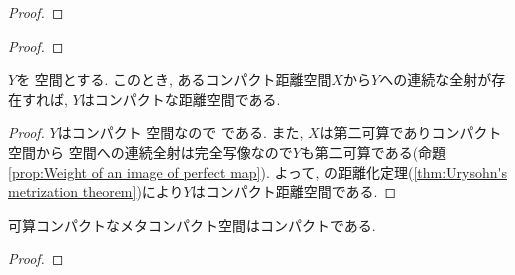 \documentclass[uplatex, dvipdfmx, a4paper, 12pt, class=jsbook, crop=false]{standalone}
\begin{document}
\begin{proof}
\end{proof}

\begin{proof}
	\WIP
\end{proof}

\begin{proposition}
	$ Y $を \Hausdorff 空間とする.
	このとき, あるコンパクト距離空間$ X $から$ Y $への連続な全射が存在すれば, $ Y $はコンパクトな距離空間である.
\end{proposition}

\begin{proof}
	$ Y $はコンパクト \Hausdorff 空間なので  である.
	また, $ X $は第二可算でありコンパクト空間から \Hausdorff 空間への連続全射は完全写像なので$ Y $も第二可算である(命題 \ref{prop:Weight of an image of perfect map}).
	よって, \Urysohn の距離化定理(\ref{thm:Urysohn's metrization theorem})により$ Y $はコンパクト距離空間である.
\end{proof}

\begin{theorem}
	可算コンパクトなメタコンパクト空間はコンパクトである.
\end{theorem}

\begin{proof}
	\WIP
\end{proof}
\end{document}
